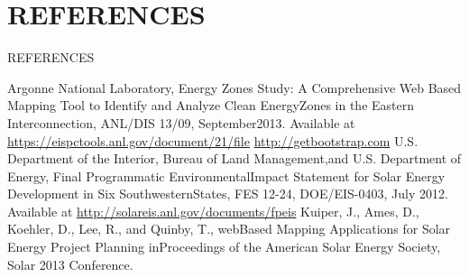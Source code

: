 \documentclass[svgnames,9pt]{beamer}
\begin{document}
\section{REFERENCES}
\begin{frame}{REFERENCES}
\begin{thebibliography}{99}
\justifying {}  Argonne National Laboratory, Energy Zones Study: A Comprehensive Web Based Mapping Tool to Identify and Analyze Clean EnergyZones in the Eastern Interconnection, ANL/DIS 13/09, September2013. Available at 
\url{https://eispctools.anl.gov/document/21/file} 
  \url{http://getbootstrap.com} 
{U.S. Department of the Interior, Bureau of Land Management,and U.S. Department of Energy, Final Programmatic EnvironmentalImpact Statement for Solar Energy Development in Six SouthwesternStates, FES 12-24, DOE/EIS-0403, July 2012. Available at} \url{http://solareis.anl.gov/documents/fpeis} 
 Kuiper, J., Ames, D., Koehler, D., Lee, R., and Quinby, T., webBased Mapping Applications for Solar Energy Project Planning inProceedings of the American Solar Energy Society, Solar 2013 Conference.
\end{thebibliography}
\end{frame} 
\end{document}
